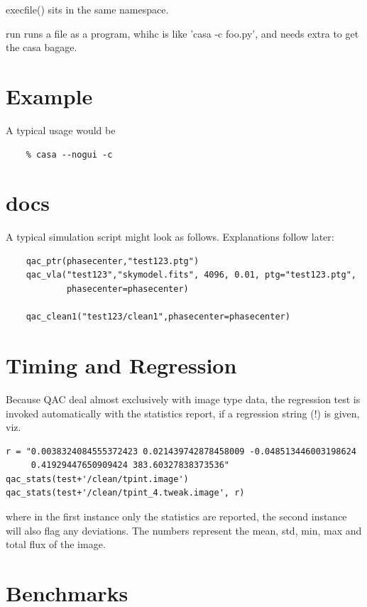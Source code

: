 \documentclass[11pt,twoside]{article}
\begin{document}
execfile() sits in the same namespace.

run runs a file as a program, whihc is like 'casa -c foo.py', and needs extra to get the casa bagage.

\section{Example}

A typical usage would be

\begin{verbatim}
    % casa --nogui -c 
\end{verbatim}


\section{docs}

A typical simulation script might look as follows. Explanations follow later:

\footnotesize
\begin{verbatim}
    qac_ptr(phasecenter,"test123.ptg")
    qac_vla("test123","skymodel.fits", 4096, 0.01, ptg="test123.ptg",
            phasecenter=phasecenter)
            
    qac_clean1("test123/clean1",phasecenter=phasecenter)
\end{verbatim}
\normalsize

\section{Timing and Regression}

Because QAC deal almost exclusively with image type data, the regression test is invoked automatically
with the statistics report, if a regression string (!) is given, viz.

\footnotesize
\begin{verbatim}
r = "0.0038324084555372423 0.021439742878458009 -0.048513446003198624
     0.41929447650909424 383.60327838373536"
qac_stats(test+'/clean/tpint.image')
qac_stats(test+'/clean/tpint_4.tweak.image', r)
\end{verbatim}
\normalsize

where in the first instance only the statistics are reported, the second instance will also flag any deviations.
The numbers represent the mean, std, min, max and total flux of the image.

\section{Benchmarks}
\end{document}
